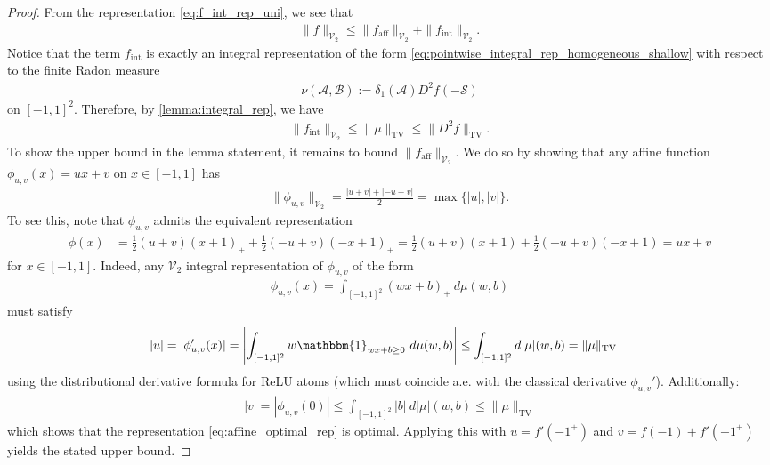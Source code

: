 \documentclass{article}
\DeclareMathOperator{\TV}{TV}
\def\cA{{\mathcal{A}}}
\def\cB{{\mathcal{B}}}
\def\cS{{\mathcal{S}}}
\def\cV{{\mathcal{V}}}
\begin{document}
\begin{appendices}
\begin{proof}
    From the representation \eqref{eq:f_int_rep_uni}, we see that
    \begin{align}
        \| f \|_{\cV_2} \leq \| f_{\mathrm{aff}} \|_{\cV_2} + \| f_{\mathrm{int}} \|_{\cV_2}.
    \end{align}
    Notice that the term $f_{\mathrm{int}}$ is exactly an integral representation of the form \eqref{eq:pointwise_integral_rep_homogeneous_shallow} with respect to the finite Radon measure 
    \begin{align}
    \nu(\cA, \cB) := \delta_1(\cA) D^2 f(- \cS)
    \end{align}
    on $[-1,1]^2$. Therefore, by \cref{lemma:integral_rep}, we have
    \begin{align}
        \| f_{\mathrm{int}} \|_{\cV_2} \leq \| \mu \|_{\TV} \leq \| D^2 f \|_{\TV}.
    \end{align}
    To show the upper bound in the lemma statement, it remains to bound $\| f_\mathrm{aff} \|_{\cV_2}$.  We do so by showing that any affine function $\phi_{u,v}(x) = ux + v$ on $x \in [-1,1]$ has 
    \begin{align}
        \| \phi_{u,v} \|_{\cV_2} = \frac{|u+v| + |-u+v|}{2} = \max \{ |u|, |v| \}.
    \end{align}
    To see this, note that $\phi_{u,v}$ admits the equivalent representation
    \begin{align} \label{eq:affine_optimal_rep}
        \phi(x) &= \frac{1}{2}(u+v)(x+1)_+ + \frac{1}{2}(-u+v)(-x+1)_+ = \frac{1}{2}(u+v)(x+1) + \frac{1}{2}(-u+v)(-x+1) = ux + v
    \end{align}
    for $x \in [-1,1]$. Indeed, any $\cV_2$ integral representation of $\phi_{u,v}$ of the form
    \begin{align}
        \phi_{u,v}(x) = \int_{[-1,1]^2} (wx + b)_+ \ d \mu(w,b) 
    \end{align}
    must satisfy
    \begin{align}
        |u| = |\phi_{u,v}'(x)| &= \left| \int_{[-1,1]^2} w \mathbbm{1}_{wx+b \geq 0} \ d \mu(w,b) \right| \leq \int_{[-1,1]^2} d |\mu|(w,b) = \| \mu \|_{\TV} 
    \end{align}
    using the distributional derivative formula for ReLU atoms (which must coincide a.e. with the classical derivative $\phi_{u,v}'$). Additionally: 
    \begin{align}
        |v| = |\phi_{u,v}(0)| \leq \int_{[-1,1]^2} |b| \ d |\mu|(w,b) \leq \| \mu \|_{\TV}
    \end{align}
    which shows that the representation \eqref{eq:affine_optimal_rep} is optimal. Applying this with $u = f'(-1^+)$ and $v = f(-1)+f'(-1^+)$ yields the stated upper bound.

\end{proof}
\end{appendices}
\end{document}

